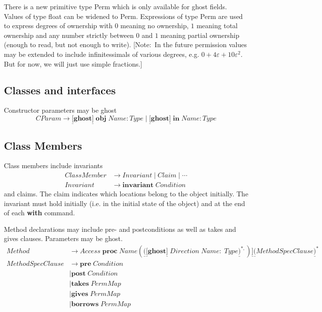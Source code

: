 \documentclass{article}%
\begin{document}
There is a new primitive type \textrm{Perm} which is only available for ghost
fields. Values of type float can be widened to Perm. Expressions of type Perm
are used to express degrees of ownership with $0$ meaning no ownership, $1$
meaning total ownership and any number strictly between $0$ and $1$ meaning
partial ownership (enough to read, but not enough to write). [Note:\ In the
future permission values may be extended to include infinitessimals of various
degrees, e.g. $0+4\varepsilon+10\varepsilon^{2}$. But for now, we will just
use simple fractions.]

\subsection{Classes and interfaces}

Constructor parameters may be ghost%
\[
CParam\rightarrow\underline{[}\mathbf{ghost}\underline{]}\;\mathbf{obj}%
\;Name:Type\mid\underline{[}\mathbf{ghost}\underline{]}\;\mathbf{in}%
\;Name:Type
\]


\subsection{Class Members}

Class members include invariants%
\begin{align*}
ClassMember &  \rightarrow Invariant\mid Claim\mid\cdots\\
Invariant &  \rightarrow\mathbf{invariant}\;Condition
\end{align*}
and claims. The claim indicates which locations belong to the object
initially. The invariant must hold initially (i.e. in the initial state of the
object) and at the end of each \textbf{with} command.

Method declarations may include pre- and postconditions as well as takes and
gives clauses. Parameters may be ghost.%
\begin{align*}
Method  &  \rightarrow Access\;\mathbf{proc}\;Name(\underline{(}%
\underline{[}\mathbf{ghost}\underline{]}\;Direction\;Name:\;Type\underline{)}%
^{\ast,})\underline{]}\underline{(}MethodSpecClause\underline{)}^{\ast}\\
MethodSpecClause  &  \rightarrow\mathbf{pre}\;Condition\\
&  \mid\mathbf{post}\;Condition\\
&  \mid\mathbf{takes}\;PermMap\\
&  \mid\mathbf{gives}\;PermMap\\
&  \mid\mathbf{borrows}\;PermMap
\end{align*}
\end{document}
